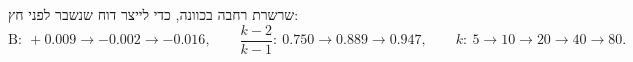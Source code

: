 %


שרשרת רחבה בכוונה, כדי לייצר דוח  שנשבר לפני חץ:
\[
\mathrm{B}:\ +0.009\to-0.002\to-0.016,\qquad
\frac{k-2}{k-1}:\ 0.750\to0.889\to0.947,\qquad
k:\ 5\to10\to20\to40\to80 .
\]

